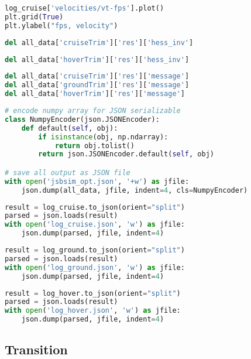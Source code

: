\begin{lstlisting}[language=Python]
log_cruise['velocities/vt-fps'].plot()
plt.grid(True)
plt.ylabel("fps, velocity")
\end{lstlisting}

\begin{lstlisting}[language=Python]
del all_data['cruiseTrim']['res']['hess_inv']
\end{lstlisting}

\begin{lstlisting}[language=Python]
del all_data['hoverTrim']['res']['hess_inv']
\end{lstlisting}

\begin{lstlisting}[language=Python]
del all_data['cruiseTrim']['res']['message']
del all_data['groundTrim']['res']['message']
del all_data['hoverTrim']['res']['message']
\end{lstlisting}

\begin{lstlisting}[language=Python]
# encode numpy array for JSON serializable
class NumpyEncoder(json.JSONEncoder):
    def default(self, obj):
        if isinstance(obj, np.ndarray):
            return obj.tolist()
        return json.JSONEncoder.default(self, obj)

# save all output as JSON file 
with open('jsbsim_opt.json', '+w') as jfile:
    json.dump(all_data, jfile, indent=4, cls=NumpyEncoder)
\end{lstlisting}

\begin{lstlisting}[language=Python]
result = log_cruise.to_json(orient="split")
parsed = json.loads(result)
with open('log_cruise.json', 'w') as jfile: 
    json.dump(parsed, jfile, indent=4)
\end{lstlisting}

\begin{lstlisting}[language=Python]
result = log_ground.to_json(orient="split")
parsed = json.loads(result)
with open('log_ground.json', 'w') as jfile: 
    json.dump(parsed, jfile, indent=4)
\end{lstlisting}

\begin{lstlisting}[language=Python]
result = log_hover.to_json(orient="split")
parsed = json.loads(result)
with open('log_hover.json', 'w') as jfile: 
    json.dump(parsed, jfile, indent=4)
\end{lstlisting}

\hypertarget{transition}{%
\subsection{Transition}\label{transition}}

